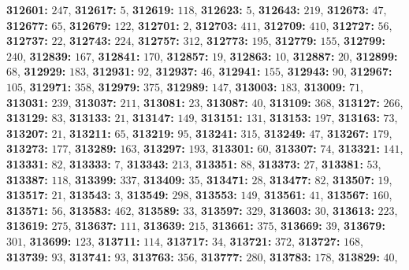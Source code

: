 \textsf{\bfseries 312601:} $247$, \textsf{\bfseries 312617:} $5$, \textsf{\bfseries 312619:} $118$, \textsf{\bfseries 312623:} $5$, \textsf{\bfseries 312643:} $219$, \textsf{\bfseries 312673:} $47$, \textsf{\bfseries 312677:} $65$, \textsf{\bfseries 312679:} $122$, \textsf{\bfseries 312701:} $2$, \textsf{\bfseries 312703:} $411$, \textsf{\bfseries 312709:} $410$, \textsf{\bfseries 312727:} $56$, \textsf{\bfseries 312737:} $22$, \textsf{\bfseries 312743:} $224$, \textsf{\bfseries 312757:} $312$, \textsf{\bfseries 312773:} $195$, \textsf{\bfseries 312779:} $155$, \textsf{\bfseries 312799:} $240$, \textsf{\bfseries 312839:} $167$, \textsf{\bfseries 312841:} $170$, \textsf{\bfseries 312857:} $19$, \textsf{\bfseries 312863:} $10$, \textsf{\bfseries 312887:} $20$, \textsf{\bfseries 312899:} $68$, \textsf{\bfseries 312929:} $183$, \textsf{\bfseries 312931:} $92$, \textsf{\bfseries 312937:} $46$, \textsf{\bfseries 312941:} $155$, \textsf{\bfseries 312943:} $90$, \textsf{\bfseries 312967:} $105$, \textsf{\bfseries 312971:} $358$, \textsf{\bfseries 312979:} $375$, \textsf{\bfseries 312989:} $147$, \textsf{\bfseries 313003:} $183$, \textsf{\bfseries 313009:} $71$, \textsf{\bfseries 313031:} $239$, \textsf{\bfseries 313037:} $211$, \textsf{\bfseries 313081:} $23$, \textsf{\bfseries 313087:} $40$, \textsf{\bfseries 313109:} $368$, \textsf{\bfseries 313127:} $266$, \textsf{\bfseries 313129:} $83$, \textsf{\bfseries 313133:} $21$, \textsf{\bfseries 313147:} $149$, \textsf{\bfseries 313151:} $131$, \textsf{\bfseries 313153:} $197$, \textsf{\bfseries 313163:} $73$, \textsf{\bfseries 313207:} $21$, \textsf{\bfseries 313211:} $65$, \textsf{\bfseries 313219:} $95$, \textsf{\bfseries 313241:} $315$, \textsf{\bfseries 313249:} $47$, \textsf{\bfseries 313267:} $179$, \textsf{\bfseries 313273:} $177$, \textsf{\bfseries 313289:} $163$, \textsf{\bfseries 313297:} $193$, \textsf{\bfseries 313301:} $60$, \textsf{\bfseries 313307:} $74$, \textsf{\bfseries 313321:} $141$, \textsf{\bfseries 313331:} $82$, \textsf{\bfseries 313333:} $7$, \textsf{\bfseries 313343:} $213$, \textsf{\bfseries 313351:} $88$, \textsf{\bfseries 313373:} $27$, \textsf{\bfseries 313381:} $53$, \textsf{\bfseries 313387:} $118$, \textsf{\bfseries 313399:} $337$, \textsf{\bfseries 313409:} $35$, \textsf{\bfseries 313471:} $28$, \textsf{\bfseries 313477:} $82$, \textsf{\bfseries 313507:} $19$, \textsf{\bfseries 313517:} $21$, \textsf{\bfseries 313543:} $3$, \textsf{\bfseries 313549:} $298$, \textsf{\bfseries 313553:} $149$, \textsf{\bfseries 313561:} $41$, \textsf{\bfseries 313567:} $160$, \textsf{\bfseries 313571:} $56$, \textsf{\bfseries 313583:} $462$, \textsf{\bfseries 313589:} $33$, \textsf{\bfseries 313597:} $329$, \textsf{\bfseries 313603:} $30$, \textsf{\bfseries 313613:} $223$, \textsf{\bfseries 313619:} $275$, \textsf{\bfseries 313637:} $111$, \textsf{\bfseries 313639:} $215$, \textsf{\bfseries 313661:} $375$, \textsf{\bfseries 313669:} $39$, \textsf{\bfseries 313679:} $301$, \textsf{\bfseries 313699:} $123$, \textsf{\bfseries 313711:} $114$, \textsf{\bfseries 313717:} $34$, \textsf{\bfseries 313721:} $372$, \textsf{\bfseries 313727:} $168$, \textsf{\bfseries 313739:} $93$, \textsf{\bfseries 313741:} $93$, \textsf{\bfseries 313763:} $356$, \textsf{\bfseries 313777:} $280$, \textsf{\bfseries 313783:} $178$, \textsf{\bfseries 313829:} $40$, 
